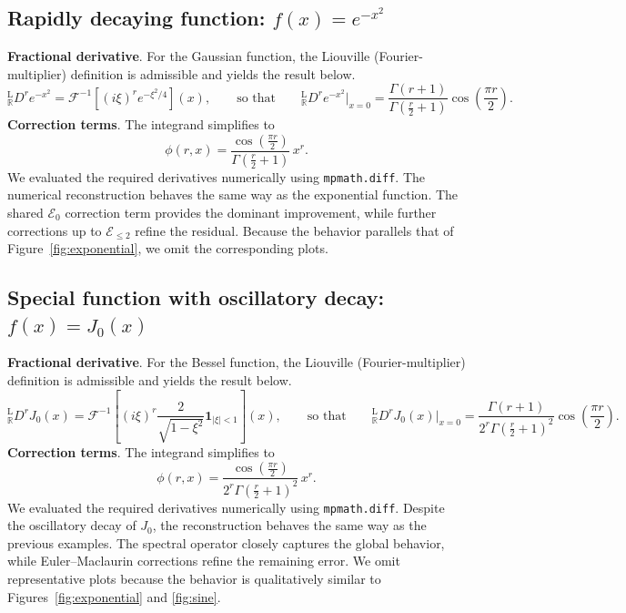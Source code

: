 \documentclass[preprint, 12pt]{elsarticle}
\theoremstyle{definition}
\theoremstyle{plain}
\theoremstyle{remark}
\begin{document}
\subsection{Rapidly decaying function: $f(x)=e^{-x^2}$}
\textbf{Fractional derivative}. For the Gaussian function, the Liouville (Fourier-multiplier) definition is admissible and yields the result below.
\[
{}^{\mathrm{L}}_{\mathbb{R}}D^{r} e^{-x^{2}}
=
\mathcal{F}^{-1}\!\left[(i\xi)^{r} e^{-\xi^{2}/4}\right](x),
\qquad\text{so that}\qquad
{}^{\mathrm{L}}_{\mathbb{R}}D^{r} e^{-x^{2}}\big|_{x=0}
=
\frac{\Gamma(r+1)}
{\Gamma\!\left(\frac{r}{2}+1\right)}
\cos\!\left(\frac{\pi r}{2}\right).
\]
\textbf{Correction terms}. The integrand simplifies to
\[
\phi(r,x)
=
\frac{\cos\!\left(\frac{\pi r}{2}\right)}{\Gamma\!\left(\frac{r}{2}+1\right)}\,x^{r}.
\]
We evaluated the required derivatives numerically using \texttt{mpmath.diff}. The numerical reconstruction behaves the same way as the exponential function. The shared $\mathcal{E}_0$ correction term provides the dominant improvement, while further corrections up to $\mathcal E_{\leq 2}$ refine the residual. Because the behavior parallels that of Figure~\ref{fig:exponential}, we omit the corresponding plots.

\subsection{Special function with oscillatory decay: $f(x)=J_0(x)$}
\textbf{Fractional derivative}. For the Bessel function, the Liouville (Fourier-multiplier) definition is admissible and yields the result below.
\[
{}^{\mathrm{L}}_{\mathbb{R}}D^{r} J_{0}(x)
=
\mathcal{F}^{-1}\!\left[(i\xi)^{r}
\frac{2}{\sqrt{1-\xi^{2}}}\mathbf{1}_{|\xi|<1}\right](x),
\qquad\text{so that}\qquad
{}^{\mathrm{L}}_{\mathbb{R}}D^{r} J_{0}(x)\big|_{x=0}
=
\frac{\Gamma(r+1)}
{2^{r}\Gamma\!\left(\frac{r}{2}+1\right)^{2}}
\cos\!\left(\frac{\pi r}{2}\right).
\]
\textbf{Correction terms}. The integrand simplifies to
\[
\phi(r,x)
=
\frac{\cos\!\left(\frac{\pi r}{2}\right)}{2^{r}\Gamma\!\left(\frac{r}{2}+1\right)^{2}}\,x^{r}.
\]
We evaluated the required derivatives numerically using \texttt{mpmath.diff}. Despite the oscillatory decay of $J_0$, the reconstruction behaves the same way as the previous examples. The spectral operator closely captures the global behavior, while Euler--Maclaurin corrections refine the remaining error. We omit representative plots because the behavior is qualitatively similar to Figures~\ref{fig:exponential} and \ref{fig:sine}.
\end{document}
